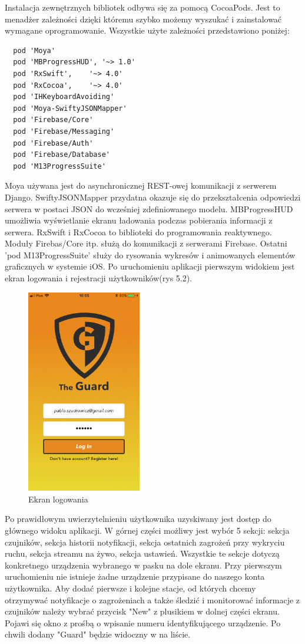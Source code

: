 Instalacja zewnętrznych bibliotek odbywa się za pomocą CocoaPods. Jest to menadżer zależności dzięki któremu szybko możemy wyszukać i zainstalować wymagane oprogramowanie. Wszystkie użyte zależności przedstawiono poniżej: 
\begin{verbatim}
  pod 'Moya'
  pod 'MBProgressHUD', '~> 1.0'
  pod 'RxSwift',    '~> 4.0'
  pod 'RxCocoa',    '~> 4.0'
  pod 'IHKeyboardAvoiding'
  pod 'Moya-SwiftyJSONMapper'
  pod 'Firebase/Core'
  pod 'Firebase/Messaging'
  pod 'Firebase/Auth'
  pod 'Firebase/Database'
  pod 'M13ProgressSuite'
\end{verbatim}
Moya używana jest do asynchronicznej REST-owej komunikacji z serwerem Django. SwiftyJSONMapper przydatna okazuje się do przekształcenia odpowiedzi serwera w postaci JSON do wcześniej zdefiniowanego modelu. MBProgressHUD umożliwia wyświetlanie ekranu ładowania podczas pobierania informacji z serwera. RxSwift i RxCocoa to biblioteki do programowania reaktywnego. Moduły Firebas/Core itp. służą do komunikacji z serwerami Firebase. Ostatni 'pod M13ProgressSuite' służy do rysowania wykresów i animowanych elementów graficznych w systemie iOS.
Po uruchomieniu aplikacji pierwszym widokiem jest ekran logowania i rejestracji użytkowników(rys 5.2). 
\begin{figure}[h]
	\centering
	\includegraphics[width=5cm]{login.png}
	\caption{Ekran logowania}
\end{figure}
Po prawidłowym uwierzytelnieniu użytkownika uzyskiwany jest dostęp do głównego widoku aplikacji. W górnej części możliwy jest wybór 5 sekcji:
sekcja czujników, sekcja historii notyfikacji, sekcja ostatnich zagrożeń przy wykryciu ruchu, sekcja streamu na żywo, sekcja ustawień. Wszystkie te sekcje dotyczą konkretnego urządzenia wybranego w pasku na dole ekranu. Przy pierwszym uruchomieniu nie istnieje żadne urządzenie przypisane do naszego konta użytkownika. Aby dodać pierwsze i kolejne stacje, od których chcemy otrzymywać notyfikacje o zagrożeniach a także śledzić i monitorować informacje z czujników należy wybrać przycisk "New" z plusikiem w dolnej części ekranu. Pojawi się okno z prośbą o wpisanie numeru identyfikującego urządzenie. Po chwili dodany "Guard" będzie widoczny w na liście.
